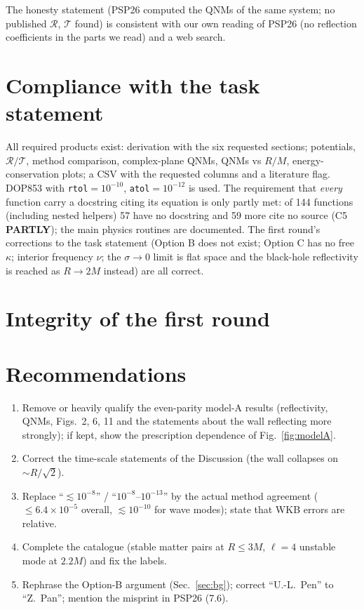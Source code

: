 \documentclass[11pt,a4paper]{article}
\newcommand{\PART}{\textcolor{orange!85!black}{\textbf{PARTLY}}}
\begin{document}
The honesty statement (PSP26 computed the QNMs of the same system; no published $\mathcal R$, $\mathcal T$ found) is
consistent with our own reading of PSP26 (no reflection coefficients in the parts we read) and a web search.

\section{Compliance with the task statement}
All required products exist: derivation with the six requested sections; potentials, $\mathcal R/\mathcal T$, method
comparison, complex-plane QNMs, QNMs vs $R/M$, energy-conservation plots; a CSV with the requested columns and a
literature flag. DOP853 with \texttt{rtol}$=10^{-10}$, \texttt{atol}$=10^{-12}$ is used. The requirement that
\emph{every} function carry a docstring citing its equation is only partly met: of 144 functions (including nested
helpers) 57 have no docstring and 59 more cite no source (C5 \PART); the main physics routines are documented. The
first round's corrections to the task statement (Option B does not exist; Option C has no free $\kappa$; interior
frequency $\nu$; the $\sigma\to0$ limit is flat space and the black-hole reflectivity is reached as $R\to2M$ instead)
are all correct.

\section{Integrity of the first round}\label{sec:integrity}


\section{Recommendations}
\begin{enumerate}
\item Remove or heavily qualify the even-parity model-A results (reflectivity, QNMs, Figs.~2, 6, 11 and the statements
about the wall reflecting more strongly); if kept, show the prescription dependence of Fig.~\ref{fig:modelA}.
\item Correct the time-scale statements of the Discussion (the wall collapses on $\sim R/\sqrt2$).
\item Replace ``$\lesssim10^{-8}$'' / ``$10^{-8}$--$10^{-13}$'' by the actual method agreement ($\le6.4\times10^{-5}$ overall,
$\lesssim10^{-10}$ for wave modes); state that WKB errors are relative.
\item Complete the catalogue (stable matter pairs at $R\le3M$, $\ell=4$ unstable mode at $2.2M$) and fix the labels.
\item Rephrase the Option-B argument (Sec.~\ref{sec:bg}); correct ``U.-L.~Pen'' to ``Z.~Pan''; mention the misprint in
PSP26 (7.6).
\end{enumerate}
\end{document}
